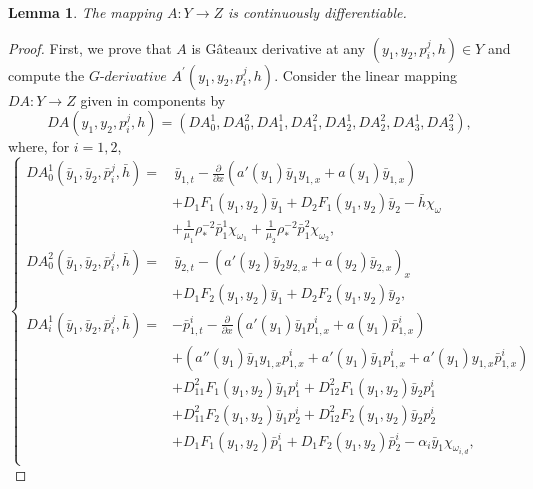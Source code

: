 \documentclass[11pt,a4paper]{amsart}
\numberwithin{equation}{section}
\newtheorem{lemma}{Lemma}[section]
\begin{document}
\begin{lemma}\label{lema2}
    The mapping $A : Y \rightarrow Z$ is continuously differentiable.
\end{lemma}
\begin{proof}
    First, we prove that $A$ is Gâteaux derivative at any $(y_1,y_2,p_i^j,h) \in Y$ and compute the
    $\textit{G-derivative}$ $A^{\prime}(y_1,y_2,p_i^j,h)$.
    Consider the linear mapping $D A: Y \to Z$ given in components by
    $$
        D A(y_1,y_2,p_i^j,h) = (D A^1_0,D A^2_0, D A^1_1, D A^2_1, D A^1_2, D A^2_2, D A^1_3, D A^2_3),
    $$
    where, for $i=1,2$,
    \begin{equation*}
        \begin{cases}
		      D A^1_0(\bar y_1,\bar y_2,\bar p_i^j,\bar h) = &  \,
              \bar y_{1,t} - \frac{\partial}{\partial x}(a'(y_{1})\bar y_{1} y_{1,x} +a(y_1) \bar y_{1,x}) \\
            &+  D_1 F_1(y_1,y_2)\bar y_1 + D_2 F_1(y_1,y_2)\bar y_2 - \bar h \chi_{\omega} \\
            &+ \frac{1}{\mu_1} \rho_*^{-2} \bar p^1_1 \chi_{\omega_{1}} + \frac{1}{\mu_2} \rho_*^{-2} \bar p^2_1 \chi_{\omega_{2}}, \\
		      D A^2_0(\bar y_1,\bar y_2,\bar p_i^j,\bar h) =
            &  \, \bar y_{2,t} - (a'(y_{2})\bar y_{2}y_{2,x} + a(y_{2}) \bar y_{2,x})_x \\
            &+ D_1 F_2(y_1,y_2)\bar y_1 + D_2 F_2(y_1,y_2)\bar y_2, \\
            D A^1_i(\bar y_1,\bar y_2,\bar p_i^j,\bar h) =& - \bar p_{1,t}^i - \frac{\partial}{\partial x}\left(a'(y_{1})\bar y_{1} p^i_{1,x} + a(y_{1}) \bar p^i_{1,x}\right) \\
            &+ \left( a''(y_{1})\bar y_{1} y_{1,x} p^i_{1,x} + a'(y_{1})\bar y_{1}  p^i_{1,x} + a'(y_1)y_{1,x} \bar p^i_{1,x} \right) \\
            &+ D_{11}^2 F_1(y_1,y_2)\bar y_1 p^i_1 + D_{12}^2 F_1(y_1,y_2)\bar y_2 p^i_1 \\
            &+ D_{11}^2 F_2(y_1,y_2)\bar y_1 p^i_2 + D_{12}^2 F_2(y_1,y_2)\bar y_2 p^i_2 \\
            &+ D_1 F_1(y_1,y_2) \bar p^i_1 + D_1 F_2(y_1,y_2) \bar p^i_2 - \alpha_i \bar y_1 \chi_{\omega_{i,d}}, \\

\end{cases}
\end{equation*}
\end{proof}
\end{document}
